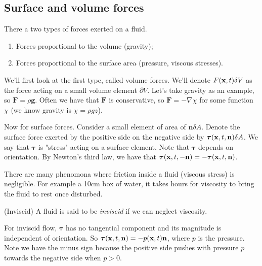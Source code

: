\documentclass{article}
\begin{document}
\subsection{Surface and volume forces}
There a two types of forces exerted on a fluid.
\begin{enumerate}
	\item Forces proportional to the volume (gravity);
	\item Forces proportional to the surface area (pressure, viscous stresses).
\end{enumerate}
We'll first look at the first type, called volume forces. We'll denote $ F(\mathbf{x},t)\delta V $ as the force acting on a small volume element $ \partial V $. Let's take gravity as an example, so $ \mathbf F=\rho \mathbf g $. Often we have that $ \mathbf F $ is conservative, so $ \mathbf F=-\nabla\chi $ for some function $ \chi $ (we know gravity is $ \chi=\rho gz $).\par
Now for surface forces. Consider a small element of area of $ \mathbf n \delta A $. Denote the surface force exerted by the positive side on the negative side by $ \boldsymbol \tau(\mathbf{x},t,\mathbf n) \delta A $. We say that $ \boldsymbol\tau $ is "stress" acting on a surface element. Note that $ \boldsymbol \tau $ depends on orientation. By Newton's third law, we have that $ \boldsymbol \tau(\mathbf{x},t,-\mathbf n) = -\boldsymbol \tau(\mathbf{x},t,\mathbf n) $.\par
There are many phenomona where friction inside a fluid (viscous stress) is negligible. For example a 10cm box of water, it takes hours for viscosity to bring the fluid to rest once disturbed.
\begin{definition}
	(Inviscid) A fluid is said to be \textit{inviscid} if we can neglect viscosity.
\end{definition}
For inviscid flow, $ \boldsymbol\tau $ has no tangential component and its magnitude is independent of orientation. So $ \boldsymbol \tau(\mathbf{x},t,\mathbf n) =-p(\mathbf{x},t)\mathbf n $, where $ p $ is the pressure. Note we have the minus sign because the positive side pushes with pressure $ p $ 	towards the negative side when $ p>0 $. 
\end{document}
